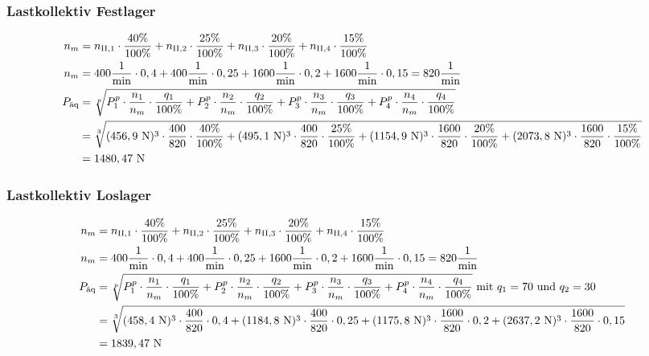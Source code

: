 \subsubsection{Lastkollektiv Festlager}
\begin{align*}
	n_m &= n_{\mathord{\mathrm{II}},1} \cdot \frac{40 \%}{100 \%} + n_{\mathord{\mathrm{II}},2} \cdot \frac{25 \%}{100 \%} + n_{\mathord{\mathrm{II}},3} \cdot \frac{20 \%}{100 \%} + n_{\mathord{\mathrm{II}},4} \cdot \frac{15 \%}{100 \%} \\
	n_m &= 400 \frac{1}{\text{min}} \cdot 0,4 + 400 \frac{1}{\text{min}} \cdot 0,25 +1600 \frac{1}{\text{min}} \cdot 0,2 + 1600 \frac{1}{\text{min}} \cdot 0,15 = 820 \frac{1}{\text{min}} \\
	P_{\text{äq}} &= \sqrt[p]{P_1 ^{p} \cdot \frac{n_1}{n_m} \cdot \frac{q_1}{100\% } + P_2 ^{p} \cdot \frac{n_2}{n_m} \cdot \frac{q_2}{100 \%} + P_3 ^{p} \cdot \frac{n_3}{n_m} \cdot \frac{q_3}{100\% } + P_4 ^{p} \cdot \frac{n_4}{n_m} \cdot \frac{q_4}{100 \%}} \\
	&= \sqrt[3]{(456,9 \text{ N}) ^{3} \cdot \frac{400}{820} \cdot \frac{40 \%}{100 \%} +(495,1 \text{ N} )^{3} \cdot \frac{400}{820} \cdot \frac{25 \%}{100\% }+(1154,9 \text{ N} )^{3} \cdot \frac{1600}{820} \cdot \frac{20 \%}{100\% } +(2073,8 \text{ N} )^{3} \cdot \frac{1600}{820} \cdot \frac{15 \%}{100\% }} \\
	&= 1480,47 \text{ N}
\end{align*}
\subsubsection{Lastkollektiv Loslager}
\begin{align*}
	n_m &= n_{\mathord{\mathrm{II}},1} \cdot \frac{40 \%}{100 \%} + n_{\mathord{\mathrm{II}},2} \cdot \frac{25 \%}{100 \%} + n_{\mathord{\mathrm{II}},3} \cdot \frac{20 \%}{100 \%} + n_{\mathord{\mathrm{II}},4} \cdot \frac{15 \%}{100 \%} \\
	n_m &= 400 \frac{1}{\text{min}} \cdot 0,4 + 400 \frac{1}{\text{min}} \cdot 0,25 + 1600 \frac{1}{\text{min}} \cdot 0,2 + 1600 \frac{1}{\text{min}} \cdot 0,15 = 820 \frac{1}{\text{min}} \\
	P_{\text{äq}} &= \sqrt[p]{P_1 ^{p} \cdot \frac{n_1}{n_m} \cdot \frac{q_1}{100\% } + P_2 ^{p} \cdot \frac{n_2}{n_m} \cdot \frac{q_2}{100 \%} +P_3 ^{p} \cdot \frac{n_3}{n_m} \cdot \frac{q_3}{100\% } + P_4 ^{p} \cdot \frac{n_4}{n_m} \cdot \frac{q_4}{100 \%}} \text{ mit $q_1 = 70$ und $q_2= 30$} \\
	&= \sqrt[3]{(458,4 \text{ N}) ^{3} \cdot \frac{400}{820} \cdot 0,4 +(1184,8 \text{ N} )^{3} \cdot \frac{400}{820} \cdot 0,25+(1175,8 \text{ N} )^{3} \cdot \frac{1600}{820} \cdot 0,2 +(2637,2 \text{ N} )^{3} \cdot \frac{1600}{820} \cdot 0,15} \\
	&= 1839,47 \text{ N}
\end{align*}

